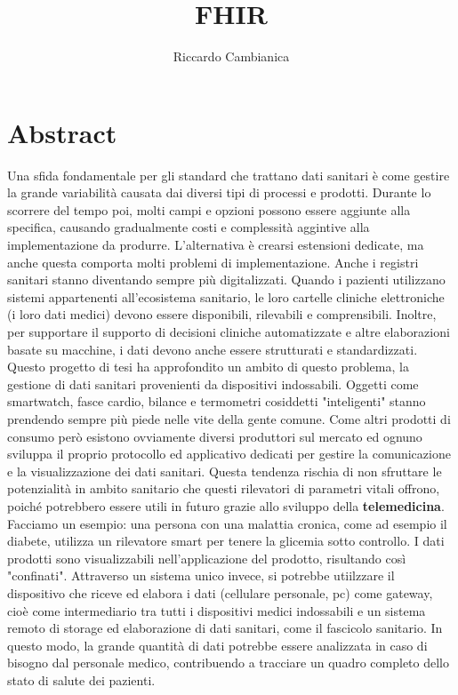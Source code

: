 \documentclass{article}
\title{FHIR}
\author{Riccardo Cambianica}
\begin{document}
\section*{Abstract}
Una sfida fondamentale per gli standard che trattano dati sanitari è come gestire la grande variabilità causata dai diversi tipi di processi e prodotti.
Durante lo scorrere del tempo poi, molti campi e opzioni possono essere aggiunte alla specifica, causando gradualmente costi e complessità aggintive alla
implementazione da produrre. L'alternativa è crearsi estensioni dedicate, ma anche questa comporta molti problemi di implementazione.
Anche i registri sanitari stanno diventando sempre più digitalizzati. Quando i pazienti utilizzano sistemi appartenenti all'ecosistema sanitario, le loro cartelle cliniche
elettroniche (i loro dati medici) devono essere disponibili, rilevabili e comprensibili. Inoltre, per supportare il supporto di decisioni cliniche automatizzate e altre elaborazioni
basate su macchine, i dati devono anche essere strutturati e standardizzati.
Questo progetto di tesi ha approfondito un ambito di questo problema, la gestione di dati sanitari provenienti da dispositivi indossabili.
Oggetti come smartwatch, fasce cardio, bilance e termometri cosiddetti "inteligenti" stanno prendendo sempre più piede nelle vite della gente comune.
Come altri prodotti di consumo però esistono ovviamente diversi produttori sul mercato ed ognuno sviluppa il proprio protocollo ed applicativo dedicati
per gestire la comunicazione e la visualizzazione dei dati sanitari.
Questa tendenza rischia di non sfruttare le potenzialità in ambito sanitario che questi rilevatori di parametri vitali offrono, poiché potrebbero essere
utili in futuro grazie allo sviluppo della \textbf{telemedicina}.
Facciamo un esempio: una persona con una malattia cronica, come ad esempio il diabete, utilizza un rilevatore smart per tenere la glicemia sotto controllo.
I dati prodotti sono visualizzabili nell'applicazione del prodotto, risultando così "confinati".
Attraverso un sistema unico invece, si potrebbe utiilzzare il dispositivo che riceve ed elabora i dati (cellulare personale, pc) come gateway, cioè come intermediario tra tutti i dispositivi
medici indossabili e un sistema remoto di storage ed elaborazione di dati sanitari, come il fascicolo sanitario.
In questo modo, la grande quantità di dati potrebbe essere analizzata in caso di bisogno dal personale medico, contribuendo a tracciare un quadro completo dello stato di salute dei pazienti.

\clearpage
\null
\thispagestyle{empty}
\end{document}
